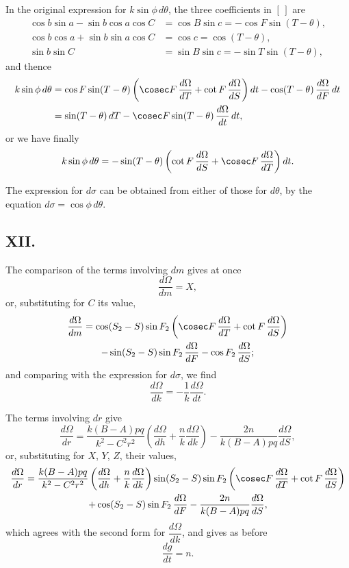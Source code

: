 \documentclass[11pt,a4paper]{book}
\begin{document}
{{In the original expression for $k\sin\phi\,d\theta$, the three coefficients in $[\,]$ are
\begin{align*}
\cos b\sin a - \sin b\cos a\cos C &= \cos B\sin c = -\cos F\sin(T-\theta), \\
\cos b\cos a + \sin b\sin a\cos C &= \cos c = \cos(T-\theta), \\
\sin b\sin C &= \sin B\sin c = -\sin T\sin(T-\theta),
\end{align*}
and thence
\begin{align*}
k\sin\phi\,d\theta &= \cos F\sin(T-\theta)\left(\cosec F\,\frac{d\Omega}{dT} + \cot F\,\frac{d\Omega}{dS}\right)dt - \cos(T-\theta)\,\frac{d\Omega}{dF}\,dt \\
&= \sin(T-\theta)\,dT - \cosec F\sin(T-\theta)\,\frac{d\Omega}{dt}\,dt,
\end{align*}
or we have finally
\[
k\sin\phi\,d\theta = -\sin(T-\theta)\left(\cot F\,\frac{d\Omega}{dS} + \cosec F\,\frac{d\Omega}{dT}\right)dt.
\]

The expression for $d\sigma$ can be obtained from either of those for $d\theta$, by the equation $d\sigma = \cos\phi\,d\theta$.

\subsection*{XII.}

The comparison of the terms involving $dm$ gives at once
\[
\frac{d\Omega}{dm} = X,
\]
or, substituting for $C$ its value,
\begin{multline*}
\frac{d\Omega}{dm} = \cos(S_2-S)\sin F_2\left(\cosec F\,\frac{d\Omega}{dT} + \cot F\,\frac{d\Omega}{dS}\right) \\
- \sin(S_2-S)\sin F_2\,\frac{d\Omega}{dF} - \cos F_2\,\frac{d\Omega}{dS};
\end{multline*}
and comparing with the expression for $d\sigma$, we find
\[
\frac{d\Omega}{dk} = -\frac{1}{k}\frac{d\Omega}{dt}.
\]

The terms involving $dr$ give
\[
\frac{d\Omega}{dr} = \frac{k(B-A)pq}{k^2-C^2r^2}\left(\frac{d\Omega}{dh} + \frac{n}{k}\frac{d\Omega}{dk}\right) - \frac{2n}{k(B-A)pq}\frac{d\Omega}{dS},
\]
or, substituting for $X$, $Y$, $Z$, their values,
\begin{multline*}
\frac{d\Omega}{dr} = \frac{k(B-A)pq}{k^2-C^2r^2}\left(\frac{d\Omega}{dh} + \frac{n}{k}\frac{d\Omega}{dk}\right)\sin(S_2-S)\sin F_2\left(\cosec F\,\frac{d\Omega}{dT} + \cot F\,\frac{d\Omega}{dS}\right) \\
+ \cos(S_2-S)\sin F_2\,\frac{d\Omega}{dF} - \frac{2n}{k(B-A)pq}\frac{d\Omega}{dS},
\end{multline*}
which agrees with the second form for $\dfrac{d\Omega}{dk}$, and gives as before
\[
\frac{dg}{dt} = n.
\]

}}
\end{document}
